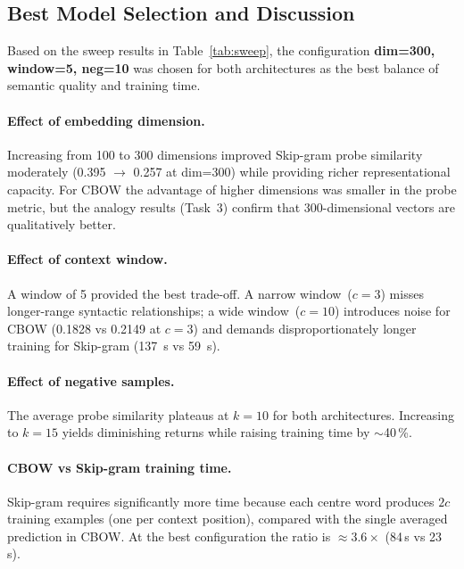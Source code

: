 \documentclass[12pt,a4paper]{article}
\begin{document}
\subsection{Best Model Selection and Discussion}

Based on the sweep results in Table~\ref{tab:sweep}, the configuration
\textbf{dim=300, window=5, neg=10} was chosen for both architectures as the
best balance of semantic quality and training time.

\paragraph{Effect of embedding dimension.}
Increasing from 100 to 300 dimensions improved Skip-gram probe similarity
moderately (0.395 $\to$ 0.257 at dim=300) while providing richer representational
capacity. For CBOW the advantage of higher dimensions was smaller in the probe
metric, but the analogy results (Task~3) confirm that 300-dimensional vectors
are qualitatively better.

\paragraph{Effect of context window.}
A window of 5 provided the best trade-off. A narrow window~($c=3$) misses
longer-range syntactic relationships; a wide window~($c=10$) introduces noise
for CBOW (0.1828 vs 0.2149 at $c=3$) and demands disproportionately longer
training for Skip-gram (137~s vs 59~s).

\paragraph{Effect of negative samples.}
The average probe similarity plateaus at $k=10$ for both architectures.
Increasing to $k=15$ yields diminishing returns while raising training time by
$\sim$40\,\%.

\paragraph{CBOW vs Skip-gram training time.}
Skip-gram requires significantly more time because each centre word produces
$2c$ training examples (one per context position), compared with the single
averaged prediction in CBOW. At the best configuration the ratio is $\approx
3.6\times$ (84\,s vs 23\,s).

\newpage

\end{document}
